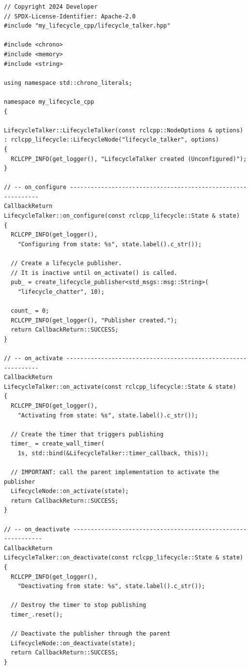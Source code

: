 \documentclass[12pt,a4paper]{article}
\begin{document}
\begin{lstlisting}[style=cpp,caption={src/lifecycle\_talker.cpp}]
// Copyright 2024 Developer
// SPDX-License-Identifier: Apache-2.0
#include "my_lifecycle_cpp/lifecycle_talker.hpp"

#include <chrono>
#include <memory>
#include <string>

using namespace std::chrono_literals;

namespace my_lifecycle_cpp
{

LifecycleTalker::LifecycleTalker(const rclcpp::NodeOptions & options)
: rclcpp_lifecycle::LifecycleNode("lifecycle_talker", options)
{
  RCLCPP_INFO(get_logger(), "LifecycleTalker created (Unconfigured)");
}

// -- on_configure -------------------------------------------------------------
CallbackReturn
LifecycleTalker::on_configure(const rclcpp_lifecycle::State & state)
{
  RCLCPP_INFO(get_logger(),
    "Configuring from state: %s", state.label().c_str());

  // Create a lifecycle publisher.
  // It is inactive until on_activate() is called.
  pub_ = create_lifecycle_publisher<std_msgs::msg::String>(
    "lifecycle_chatter", 10);

  count_ = 0;
  RCLCPP_INFO(get_logger(), "Publisher created.");
  return CallbackReturn::SUCCESS;
}

// -- on_activate --------------------------------------------------------------
CallbackReturn
LifecycleTalker::on_activate(const rclcpp_lifecycle::State & state)
{
  RCLCPP_INFO(get_logger(),
    "Activating from state: %s", state.label().c_str());

  // Create the timer that triggers publishing
  timer_ = create_wall_timer(
    1s, std::bind(&LifecycleTalker::timer_callback, this));

  // IMPORTANT: call the parent implementation to activate the publisher
  LifecycleNode::on_activate(state);
  return CallbackReturn::SUCCESS;
}

// -- on_deactivate -------------------------------------------------------------
CallbackReturn
LifecycleTalker::on_deactivate(const rclcpp_lifecycle::State & state)
{
  RCLCPP_INFO(get_logger(),
    "Deactivating from state: %s", state.label().c_str());

  // Destroy the timer to stop publishing
  timer_.reset();

  // Deactivate the publisher through the parent
  LifecycleNode::on_deactivate(state);
  return CallbackReturn::SUCCESS;
}


\end{lstlisting}
\end{document}
